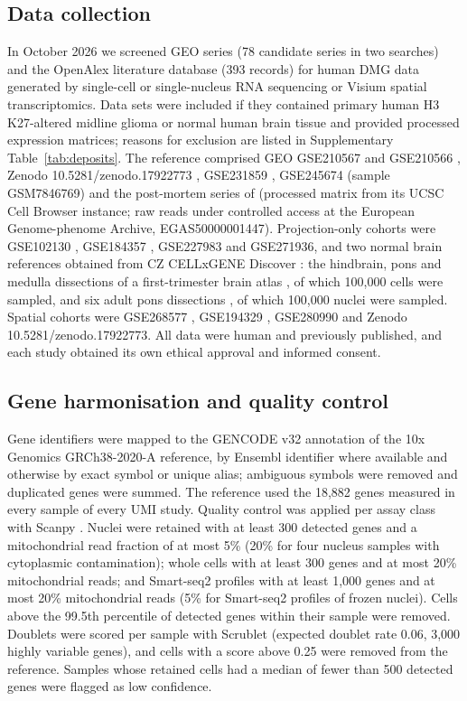 \documentclass[11pt,a4paper]{article}
\begin{document}
\subsection{Data collection}
In October 2026 we screened GEO series (78 candidate series in two searches) and the OpenAlex literature database (393
records) for human DMG data generated by single-cell or single-nucleus RNA sequencing or Visium spatial transcriptomics.
Data sets were included if they contained primary human H3 K27-altered midline glioma or normal human brain tissue and
provided processed expression matrices; reasons for exclusion are listed in Supplementary Table~\ref{tab:deposits}. The
reference comprised GEO GSE210567 and GSE210566 \citep{jessa2022km}, Zenodo 10.5281/zenodo.17922773
\citep{collot2026igsfvista}, GSE231859 \citep{desisto2024tumor}, GSE245674 (sample GSM7846769) \citep{zang2024singlecell}
and the post-mortem series of \citet{okada2026singlenucleus} (processed matrix from its UCSC Cell Browser instance; raw
reads under controlled access at the European Genome-phenome Archive, EGAS50000001447). Projection-only cohorts were
GSE102130 \citep{filbin2018developmental}, GSE184357 \citep{liu2022landscape}, GSE227983 and GSE271936, and two normal brain
references obtained from CZ CELLxGENE Discover \citep{abdulla2025czcellxgene}: the hindbrain, pons and medulla dissections
of a first-trimester brain atlas \citep{braun2023comprehensive}, of which 100,000 cells were sampled, and six adult pons
dissections \citep{siletti2023transcriptomic}, of which 100,000 nuclei were sampled. Spatial cohorts were GSE268577
\citep{huchede2024bmp}, GSE194329 \citep{ren2023spatial}, GSE280990 \citep{kordowski2025spatial} and Zenodo 10.5281/zenodo.17922773. All data were
human and previously published, and each study obtained its own ethical approval and informed consent.

\subsection{Gene harmonisation and quality control}
Gene identifiers were mapped to the GENCODE v32 annotation of the 10x Genomics GRCh38-2020-A reference, by Ensembl
identifier where available and otherwise by exact symbol or unique alias; ambiguous symbols were removed and duplicated
genes were summed. The reference used the 18,882 genes measured in every sample of every UMI study. Quality control was
applied per assay class with Scanpy \citep{wolf2018scanpy}. Nuclei were retained with at least 300 detected genes and a
mitochondrial read fraction of at most 5\% (20\% for four nucleus samples with cytoplasmic contamination); whole cells with
at least 300 genes and at most 20\% mitochondrial reads; and Smart-seq2 profiles with at least 1,000 genes and at most 20\%
mitochondrial reads (5\% for Smart-seq2 profiles of frozen nuclei).
Cells above the 99.5th percentile of detected genes within their sample were removed. Doublets were scored per sample with
Scrublet \citep{wolock2019scrublet} (expected doublet rate 0.06, 3,000 highly variable genes), and cells with a score above
0.25 were removed from the reference. Samples whose retained cells had a median of fewer than 500 detected genes were
flagged as low confidence.
\end{document}
